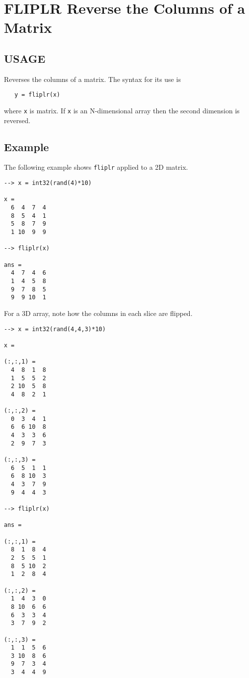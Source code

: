 \section{FLIPLR Reverse the Columns of a Matrix}

\subsection{USAGE}

Reverses the columns of a matrix.  The syntax for its use is
\begin{verbatim}
   y = fliplr(x)
\end{verbatim}
where \verb|x| is matrix.  If \verb|x| is an N-dimensional array then
the second dimension is reversed.
\subsection{Example}

The following example shows \verb|fliplr| applied to a 2D matrix.
\begin{verbatim}
--> x = int32(rand(4)*10)

x = 
  6  4  7  4 
  8  5  4  1 
  5  8  7  9 
  1 10  9  9 

--> fliplr(x)

ans = 
  4  7  4  6 
  1  4  5  8 
  9  7  8  5 
  9  9 10  1 
\end{verbatim}
For a 3D array, note how the columns in each slice are flipped.
\begin{verbatim}
--> x = int32(rand(4,4,3)*10)

x = 

(:,:,1) = 
  4  8  1  8 
  1  5  5  2 
  2 10  5  8 
  4  8  2  1 

(:,:,2) = 
  0  3  4  1 
  6  6 10  8 
  4  3  3  6 
  2  9  7  3 

(:,:,3) = 
  6  5  1  1 
  6  8 10  3 
  4  3  7  9 
  9  4  4  3 

--> fliplr(x)

ans = 

(:,:,1) = 
  8  1  8  4 
  2  5  5  1 
  8  5 10  2 
  1  2  8  4 

(:,:,2) = 
  1  4  3  0 
  8 10  6  6 
  6  3  3  4 
  3  7  9  2 

(:,:,3) = 
  1  1  5  6 
  3 10  8  6 
  9  7  3  4 
  3  4  4  9 
\end{verbatim}
